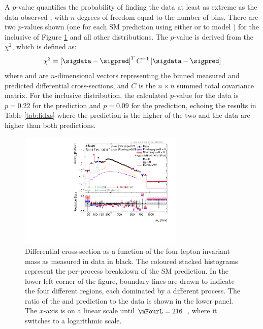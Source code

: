 A $p$-value quantifies the probability of finding the data at least as extreme as the data observed \cite{cowan_munich}, with $n$ degrees of freedom equal to the number of bins. There are two $p$-values shown (one for each SM prediction using either \SHERPA{} or \POWHEG{} to model \qqFourL{}) for the inclusive \mFourL{} of Figure \ref{fig:cross-sec-m4l} and all other distributions. The $p$-value is derived from the $\chi^2$, which is defined as:
\begin{equation}
    \chi^2 = \left[ \sigdata - \sigpred \right] ^T C^{-1} \left[  \sigdata - \sigpred  \right]
\end{equation}
where \sigdata{} and \sigpred are $n$-dimensional vectors representing the binned measured and predicted differential cross-sections, and $C$ is the $n\times n$ summed total covariance matrix. For the inclusive \mFourL{} distribution, the calculated $p$-value for the data is $p=0.22$ for the \SHERPA{} prediction and $p=0.09$ for the \POWHEG{} prediction, echoing the results in Table \ref{tab:fidxs} where the \SHERPA{} prediction is the higher of the two and the data are higher than both predictions. 
\begin{figure}[tb]
  \centering
  \includegraphics[width = 0.7\textwidth]{Figures/m4l/UnfoldedResults/linlog_Unfolded_Data_inclm4l.pdf} 
    \caption{Differential cross-section as a function of the four-lepton invariant mass \mFourL as measured in data in black. \errorbars{} \SMpredictions{} 
    The coloured stacked histograms represent the per-process breakdown of the SM prediction. In the lower left corner of the figure, boundary lines are drawn to indicate the four different \mFourL{} regions, each dominated by a different process. \Pvalue{} 
    The ratio of the \SHERPA{} and \POWHEG{} prediction to the data is shown in the lower panel. The $x$-axis is on a linear scale until $\mFourL = 216$~\GeV, where it switches to a logarithmic scale. \label{fig:cross-sec-m4l}}
\end{figure}

